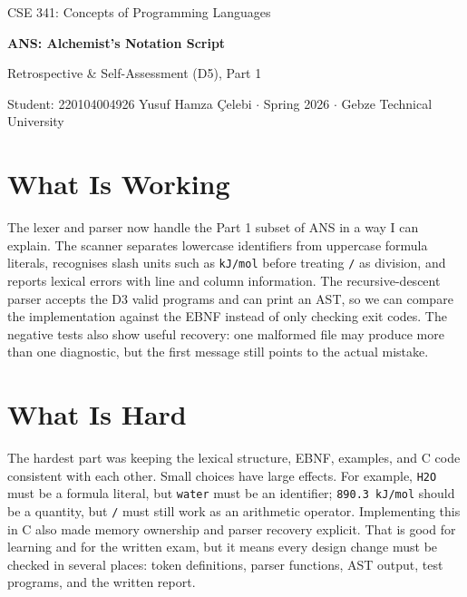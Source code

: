 \documentclass[11pt,a4paper]{article}
\newcommand{\code}[1]{\texttt{#1}}
\begin{document}
\begin{center}
  {\footnotesize\color{anscaption}CSE 341: Concepts of Programming Languages\par}
  \vspace{3pt}
  {\huge\bfseries\sffamily ANS: Alchemist's Notation Script\par}
  \vspace{4pt}
  {\large Retrospective \& Self-Assessment (D5), Part 1\par}
  \vspace{6pt}
  {\footnotesize\color{anscaption}
    Student: 220104004926 Yusuf Hamza Çelebi \(\cdot\)
    Spring 2026 \(\cdot\)
    Gebze Technical University\par}
\end{center}
\vspace{7pt}

\section{What Is Working}

The lexer and parser now handle the Part 1 subset of ANS in a way I can explain. The scanner separates lowercase identifiers from uppercase formula literals, recognises slash units such as \code{kJ/mol} before treating \code{/} as division, and reports lexical errors with line and column information. The recursive-descent parser accepts the D3 valid programs and can print an AST, so we can compare the implementation against the EBNF instead of only checking exit codes. The negative tests also show useful recovery: one malformed file may produce more than one diagnostic, but the first message still points to the actual mistake.

\section{What Is Hard}

The hardest part was keeping the lexical structure, EBNF, examples, and C code consistent with each other. Small choices have large effects. For example, \code{H2O} must be a formula literal, but \code{water} must be an identifier; \code{890.3 kJ/mol} should be a quantity, but \code{/} must still work as an arithmetic operator. Implementing this in C also made memory ownership and parser recovery explicit. That is good for learning and for the written exam, but it means every design change must be checked in several places: token definitions, parser functions, AST output, test programs, and the written report.
\end{document}
